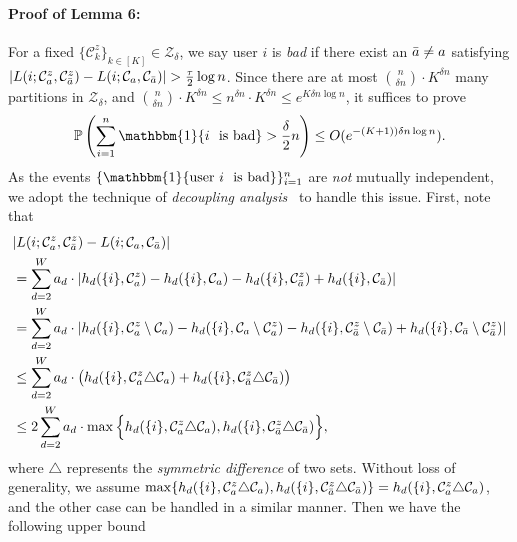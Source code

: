 \documentclass{article}
\begin{document}
\paragraph{Proof of Lemma 6:} 
    For a fixed $\{ \mathcal{C}_k^z \}_{k \in [K]} \in \mathcal{Z}_\delta$, we say user $i$ is \emph{bad} if there exist an $\Bar{a} \neq a$ satisfying $|L(i; \mathcal{C}_a^z, \mathcal{C}_{\Bar{a}}^z) - L(i; \mathcal{C}_a, \mathcal{C}_{\Bar{a}}) | > \frac{\tau}{2} \log n$. Since there are at most $\binom{n}{\delta n}\cdot K^{\delta n}$ many partitions in $\mathcal{Z}_\delta$, and $\binom{n}{\delta n}\cdot K^{\delta n} \leq n^{\delta n}\cdot K^{\delta n} \leq e^{K\delta n \log n}$, it suffices to prove
    $$
	\mathbb{P}\left( \sum_{i=1}^{n} \mathbbm{1} \{ i \text{ \ is bad} \} > \frac{\delta}{2} n \right) \leq O(e^{-(K+1))\delta n \log n}).
    $$
    As the events $\{ \mathbbm{1} \{\text{user} \  i \text{ \ is bad} \}\}_{i=1}^{n}$ are \emph{not} mutually independent, we adopt the technique of \emph{decoupling analysis}~\cite{chen2016community} to handle this issue. First, note that
    \begin{equation}\label{s64}
            \begin{aligned}
            &|L(i; \mathcal{C}_a^z, \mathcal{C}_{\Bar{a}}^z)-L(i; \mathcal{C}_a, \mathcal{C}_{\Bar{a}})| \\
            & = \sum_{d=2}^{W} a_d \cdot |h_d(\{i\}, \mathcal{C}_a^z) - h_d(\{i\}, \mathcal{C}_a) -h_d(\{i\}, \mathcal{C}_{\Bar{a}}^z) + h_d(\{i\}, \mathcal{C}_{\Bar{a}})| \\
            & = \sum_{d=2}^{W} a_d \cdot  |h_d(\{i\}, \mathcal{C}_a^z \setminus \mathcal{C}_a) - h_d(\{i\}, \mathcal{C}_a \setminus \mathcal{C}_a^z) - h_d(\{i\}, \mathcal{C}_{\Bar{a}}^z \setminus \mathcal{C}_{\Bar{a}}) + h_d(\{i\}, \mathcal{C}_{\Bar{a}} \setminus \mathcal{C}_{\Bar{a}}^z)| \\
            & \leq \sum_{d=2}^{W}  a_d \cdot  \big( h_d(\{i\}, \mathcal{C}_a^z \triangle \mathcal{C}_a) + h_d(\{i\}, \mathcal{C}_{\Bar{a}}^z \triangle \mathcal{C}_{\Bar{a}} ) \big) \\
            &\leq 2 \sum_{d=2}^{W}  a_d \cdot  \max \Big\{ h_d(\{i\}, \mathcal{C}_a^z \triangle \mathcal{C}_a), h_d(\{i\}, \mathcal{C}_{\Bar{a}}^z \triangle \mathcal{C}_{\Bar{a}})\Big\},
            \end{aligned}
	\end{equation}
where $\triangle$ represents the \emph{symmetric difference} of two sets. Without loss of generality, we assume $\max \{ h_d(\{i\}, \mathcal{C}_a^z \triangle \mathcal{C}_a), h_d(\{i\}, \mathcal{C}_{\Bar{a}}^z \triangle \mathcal{C}_{\Bar{a}})\} = h_d(\{i\}, \mathcal{C}_a^z \triangle \mathcal{C}_a)$, and the other case can be handled in a similar manner. Then we have the following upper bound
\end{document}
